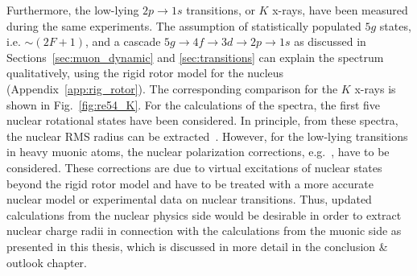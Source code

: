 %
%
%
Furthermore, the low-lying $2p\rightarrow1s$ transitions, or $K$ x-rays, have been measured during the same experiments. The assumption of statistically populated $5g$ states, i.e. $\sim (2F+1)$, and a cascade $5g\rightarrow 4f \rightarrow 3d \rightarrow 2p \rightarrow 1s$ as discussed in Sections~\ref{sec:muon_dynamic} and \ref{sec:transitions} can explain the spectrum qualitatively, using the rigid rotor model for the nucleus (Appendix~\ref{app:rig_rotor}). The corresponding comparison for the $K$ x-rays is shown in Fig.~\ref{fig:re54_K}. For the calculations of the spectra, the first five nuclear rotational states have been considered. In principle, from these spectra, the nuclear RMS radius can be extracted~\cite{hitlin1970}. However, for the low-lying transitions in heavy muonic atoms, the nuclear polarization corrections, e.g.~\cite{chen1970}, have to be considered. These corrections are due to virtual excitations of nuclear states beyond the rigid rotor model and have to be treated with a more accurate nuclear model or experimental data on nuclear transitions. Thus, updated calculations from the nuclear physics side would be desirable in order to extract nuclear charge radii in connection with the calculations from the muonic side as presented in this thesis, which is discussed in more detail in the conclusion \& outlook chapter.
